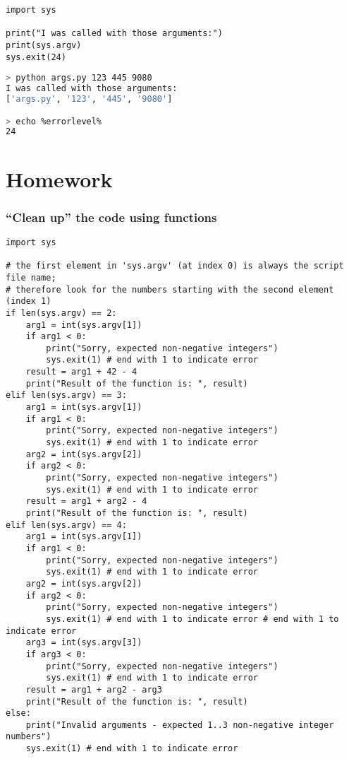 \documentclass[aspectratio=169]{beamer}
\newcommand{\style}[1]{\ttfamily#1}
\begin{document}
\begin{frame}[fragile]
\begin{lstlisting}
import sys

print("I was called with those arguments:")
print(sys.argv)
sys.exit(24)
\end{lstlisting}
\vspace{1.5cm}
\begin{lstlisting}[language=sh]
> python args.py 123 445 9080
I was called with those arguments:
['args.py', '123', '445', '9080']

> echo %errorlevel%
24
\end{lstlisting}
\end{frame}

\section{Homework}

\begin{frame}[fragile]
\frametitle{``Clean up'' the code using functions}
\begin{lstlisting}[basicstyle=\style{\fontsize{4}{4}\selectfont{}}]
import sys

# the first element in 'sys.argv' (at index 0) is always the script file name;
# therefore look for the numbers starting with the second element (index 1)
if len(sys.argv) == 2:
    arg1 = int(sys.argv[1])
    if arg1 < 0:
        print("Sorry, expected non-negative integers")
        sys.exit(1) # end with 1 to indicate error
    result = arg1 + 42 - 4
    print("Result of the function is: ", result)
elif len(sys.argv) == 3:
    arg1 = int(sys.argv[1])
    if arg1 < 0:
        print("Sorry, expected non-negative integers")
        sys.exit(1) # end with 1 to indicate error
    arg2 = int(sys.argv[2])
    if arg2 < 0:
        print("Sorry, expected non-negative integers")
        sys.exit(1) # end with 1 to indicate error
    result = arg1 + arg2 - 4
    print("Result of the function is: ", result)
elif len(sys.argv) == 4:
    arg1 = int(sys.argv[1])
    if arg1 < 0:
        print("Sorry, expected non-negative integers")
        sys.exit(1) # end with 1 to indicate error
    arg2 = int(sys.argv[2])
    if arg2 < 0:
        print("Sorry, expected non-negative integers")
        sys.exit(1) # end with 1 to indicate error # end with 1 to indicate error
    arg3 = int(sys.argv[3])
    if arg3 < 0:
        print("Sorry, expected non-negative integers")
        sys.exit(1) # end with 1 to indicate error
    result = arg1 + arg2 - arg3
    print("Result of the function is: ", result)
else:
    print("Invalid arguments - expected 1..3 non-negative integer numbers")
    sys.exit(1) # end with 1 to indicate error
\end{lstlisting}

\end{frame}
\end{document}
